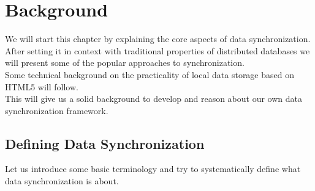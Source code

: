 
\chapter{Background}
\label{sec:background}

We will start this chapter by explaining the core aspects of data synchronization.
After setting it in context with traditional properties of distributed databases we will present some of the popular approaches to synchronization.\\
Some technical background on the practicality of local data storage based on HTML5 will follow.\\
This will give us a solid background to develop and reason about our own data synchronization framework.

\section{Defining Data Synchronization}
\label{sec:background.definition}
Let us introduce some basic terminology and try to systematically define what data synchronization is about.

